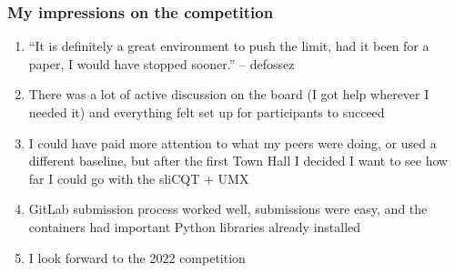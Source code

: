 \documentclass[usenames,dvipsnames]{beamer}
\begin{document}
\begin{frame}
	\frametitle{My impressions on the competition}
	\begin{enumerate}
	\item
	 ``It is definitely a great environment to push the limit, had it been for a paper, I would have stopped sooner.'' -- defossez
	 \item
		 There was a lot of active discussion on the board (I got help wherever I needed it) and everything felt set up for participants to succeed
	 \item
		 I could have paid more attention to what my peers were doing, or used a different baseline, but after the first Town Hall I decided I want to see how far I could go with the sliCQT + UMX
	 \item
		 GitLab submission process worked well, submissions were easy, and the containers had important Python libraries already installed
	 \item
		 I look forward to the 2022 competition
	\end{enumerate}
\end{frame}
\end{document}
